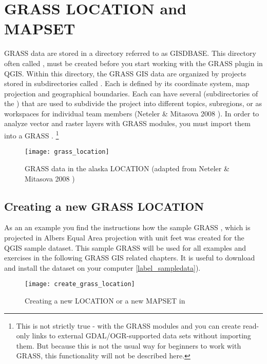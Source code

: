 \section{GRASS LOCATION and MAPSET}\label{sec:about_loc}

GRASS data are stored in a directory referred to as GISDBASE. This directory
often called , must be created before you start working
with the GRASS plugin in QGIS. Within this directory, the GRASS GIS data
are organized by projects stored in subdirectories called .
Each  is defined by its coordinate system, map projection
and geographical boundaries. Each  can have several
 (subdirectories of the ) that are used
to subdivide the project into different topics, subregions, or as workspaces
for individual team members (Neteler \& Mitasova 2008
\cite{neteler_mitasova08}). In order to analyze vector and raster layers with
GRASS modules, you must import them into a GRASS .
\footnote{This is not strictly true - with the GRASS modules
 and  you can create read-only links
to external GDAL/OGR-supported data sets without importing them. But because
this is not the usual way for beginners to work with GRASS, this functionality
will not be described here.}

\begin{figure}[ht]
\centering
\texttt{[image: grass\_location]}
\caption{GRASS data in the alaska LOCATION (adapted from Neteler \& Mitasova 2008 \cite{neteler_mitasova08})}\label{fig:grass_location}\end{figure}

\subsection{Creating a new GRASS LOCATION}\label{sec:create_loc}

As an an example you find the instructions how the sample GRASS
, which is projected in Albers Equal Area
projection with unit feet was created for the QGIS sample dataset. This
sample GRASS  will be used for all examples and
exercises in the following GRASS GIS related chapters. It is useful to
download and install the dataset on your computer \ref{label_sampledata}).

\begin{figure}[ht]
\centering
\texttt{[image: create\_grass\_location]}
\caption{Creating a new \grass LOCATION or a new MAPSET in \qg \nixcaption}
\label{fig:create_grass_location}
\end{figure}

